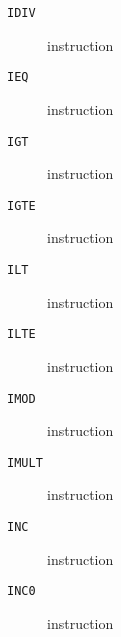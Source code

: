 \clearpage
\begin{description}
\item[\texttt{IDIV}] instruction\\

\end{description}
\clearpage
\begin{description}
\item[\texttt{IEQ}] instruction\\

\end{description}
\clearpage
\begin{description}
\item[\texttt{IGT}] instruction\\

\end{description}
\clearpage
\begin{description}
\item[\texttt{IGTE}] instruction\\

\end{description}
\clearpage
\begin{description}
\item[\texttt{ILT}] instruction\\

\end{description}
\clearpage
\begin{description}
\item[\texttt{ILTE}] instruction\\

\end{description}
\clearpage
\begin{description}
\item[\texttt{IMOD}] instruction\\

\end{description}
\clearpage
\begin{description}
\item[\texttt{IMULT}] instruction\\

\end{description}
\clearpage
\begin{description}
\item[\texttt{INC}] instruction\\

\end{description}
\clearpage
\begin{description}
\item[\texttt{INC0}] instruction\\

\end{description}
